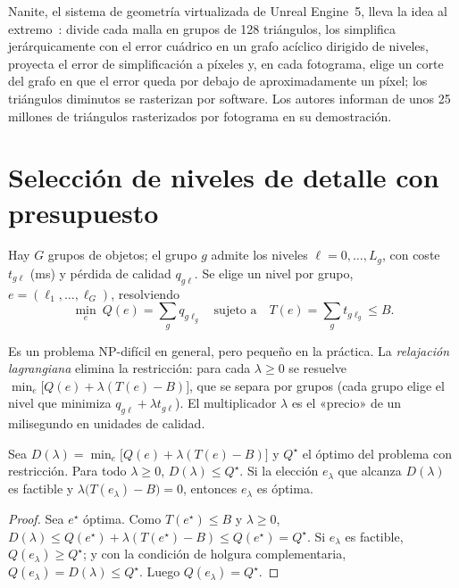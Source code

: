 Nanite, el sistema de geometría virtualizada de Unreal Engine~5, lleva la idea al extremo~\cite{nanite}: divide cada malla en grupos de 128 triángulos, los simplifica jerárquicamente con el error cuádrico en un grafo acíclico dirigido de niveles, proyecta el error de simplificación a píxeles y, en cada fotograma, elige un corte del grafo en que el error queda por debajo de aproximadamente un píxel; los triángulos diminutos se rasterizan por software. Los autores informan de unos 25 millones de triángulos rasterizados por fotograma en su demostración.

\section{Selección de niveles de detalle con presupuesto}

\begin{definicion}\label{def:mckp}
Hay $G$ grupos de objetos; el grupo $g$ admite los niveles $\ell=0,\dots,L_g$, con coste $t_{g\ell}$ (ms) y pérdida de calidad $q_{g\ell}$. Se elige un nivel por grupo, $e=(\ell_1,\dots,\ell_G)$, resolviendo
\[
\min_e\ Q(e)=\sum_gq_{g\ell_g}\quad\text{sujeto a}\quad T(e)=\sum_gt_{g\ell_g}\le B .
\]
\end{definicion}

Es un problema NP-difícil en general, pero pequeño en la práctica. La \emph{relajación lagrangiana} elimina la restricción: para cada $\lambda\ge 0$ se resuelve $\min_e\bigl[Q(e)+\lambda(T(e)-B)\bigr]$, que se separa por grupos (cada grupo elige el nivel que minimiza $q_{g\ell}+\lambda t_{g\ell}$). El multiplicador $\lambda$ es el «precio» de un milisegundo en unidades de calidad.

\begin{proposicion}\label{prop:dual}
Sea $D(\lambda)=\min_e\bigl[Q(e)+\lambda(T(e)-B)\bigr]$ y $Q^\star$ el óptimo del problema con restricción. Para todo $\lambda\ge 0$, $D(\lambda)\le Q^\star$. Si la elección $e_\lambda$ que alcanza $D(\lambda)$ es factible y $\lambda\bigl(T(e_\lambda)-B\bigr)=0$, entonces $e_\lambda$ es óptima.
\end{proposicion}

\begin{proof}
Sea $e^\star$ óptima. Como $T(e^\star)\le B$ y $\lambda\ge 0$, $D(\lambda)\le Q(e^\star)+\lambda(T(e^\star)-B)\le Q(e^\star)=Q^\star$. Si $e_\lambda$ es factible, $Q(e_\lambda)\ge Q^\star$; y con la condición de holgura complementaria, $Q(e_\lambda)=D(\lambda)\le Q^\star$. Luego $Q(e_\lambda)=Q^\star$.
\end{proof}


